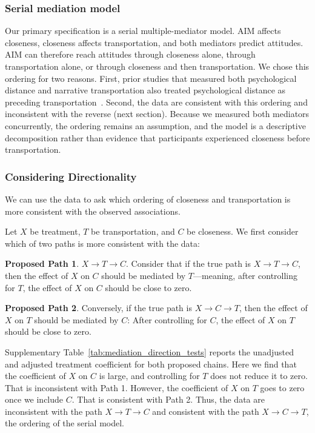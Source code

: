 \documentclass[11pt]{article}
\begin{document}
\subsubsection{Serial mediation model}
\label{sec:si-serial-model}

Our primary specification is a serial multiple-mediator model. AIM affects closeness, closeness affects transportation, and both mediators predict attitudes. AIM can therefore reach attitudes through closeness alone, through transportation alone, or through closeness and then transportation. We chose this ordering for two reasons. First, prior studies that measured both psychological distance and narrative transportation also treated psychological distance as preceding transportation~\cite{liu_narrative_2023,morales_riech_role_2025}. Second, the data are consistent with this ordering and inconsistent with the reverse (next section). Because we measured both mediators concurrently, the ordering remains an assumption, and the model is a descriptive decomposition rather than evidence that participants experienced closeness before transportation.


\subsubsection{Considering Directionality}
\label{sec:si-mediation-directionality}
We can use the data to ask which ordering of closeness and transportation is more consistent with the observed associations.

Let $X$ be treatment, $T$ be transportation, and $C$ be closeness. We first consider which of two paths is more consistent with the data:

\textbf{Proposed Path 1}. $X \to T \to C$. Consider that if the true path is $X \to T \to C$, then the effect of $X$ on $C$ should be mediated by $T$---meaning, after controlling for $T$, the effect of $X$ on $C$ should be close to zero.

\textbf{Proposed Path 2}. Conversely, if the true path is $X \to C \to T$, then the effect of $X$ on $T$ should be mediated by $C$: After controlling for $C$, the effect of $X$ on $T$ should be close to zero.

Supplementary Table~\ref{tab:mediation_direction_tests} reports the unadjusted and adjusted treatment coefficient for both proposed chains. Here we find that the coefficient of $X$ on $C$ is large, and controlling for $T$ does not reduce it to zero. That is inconsistent with Path 1. However, the coefficient of $X$ on $T$ goes to zero once we include $C$. That is consistent with Path 2. Thus, the data are inconsistent with the path $X \to T \to C$ and consistent with the path $X \to C \to T$, the ordering of the serial model.
\end{document}
